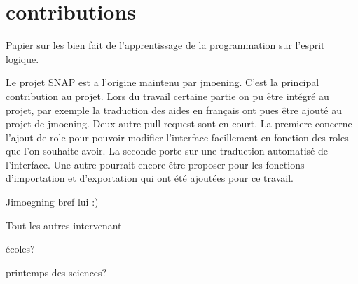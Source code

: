 \section{contributions}
\label{intro-contribution}
Papier sur les bien fait de l'apprentissage de la programmation sur l'esprit logique.

Le projet SNAP est a l'origine maintenu par jmoening. C'est la principal contribution au projet. Lors du travail certaine partie on pu être intégré au projet, par exemple la traduction des aides en français ont pues être ajouté au projet de jmoening. Deux autre pull request sont en court. La premiere concerne l'ajout de role pour pouvoir modifier l'interface facillement en fonction des roles que l'on souhaite avoir. La seconde porte sur une traduction automatisé de l'interface. Une autre pourrait encore être proposer pour les fonctions d'importation et d'exportation qui ont été ajoutées pour ce travail.

Jimoegning bref lui :)

Tout les autres intervenant

écoles?

printemps des sciences?

